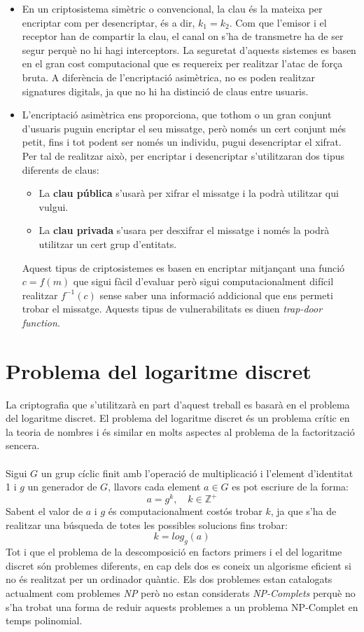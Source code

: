 \documentclass{article}
\begin{document}
\begin{itemize}
	\item En un criptosistema simètric o convencional, la clau és la mateixa per encriptar com per desencriptar, és a dir, $k_1 = k_2$. Com que l'emisor i el receptor han de compartir la clau, el canal on s'ha de transmetre ha de ser segur perquè no hi hagi interceptors. La seguretat d'aquests sistemes es basen en el gran cost computacional que es requereix per realitzar l'atac de força bruta. A diferència de l'encriptació asimètrica, no es poden realitzar signatures digitals, ja que no hi ha distinció de claus entre usuaris.
	\item L'encriptació asimètrica ens proporciona, que tothom o un gran conjunt d'usuaris puguin encriptar el seu missatge, però només un cert conjunt més petit, fins i tot podent ser només un individu, pugui desencriptar el xifrat. Per tal de realitzar això, per encriptar i desencriptar s'utilitzaran dos tipus diferents de claus:
	\begin{itemize}
		\item La \textbf{clau pública} s'usarà per xifrar el missatge i la podrà utilitzar qui vulgui.
		\item La \textbf{clau privada} s'usara per desxifrar el missatge i només la podrà utilitzar un cert grup d'entitats.
	\end{itemize}
	Aquest tipus de criptosistemes es basen en encriptar mitjançant una funció $c = f(m)$ que sigui fàcil d'evaluar però sigui computacionalment difícil realitzar $f^{-1}(c)$ sense saber una informació addicional que ens permeti trobar el missatge. Aquests tipus de vulnerabilitats es diuen \textit{trap-door function}.
\end{itemize}

\section{Problema del logaritme discret}
La criptografia que s'utilitzarà en part d'aquest treball es basarà en el problema del logaritme discret.
El problema del logaritme discret és un problema crític en la teoria de nombres i és similar en molts aspectes al problema de la factorització sencera.
\\
\\
Sigui $G$ un grup cíclic finit amb l'operació de multiplicació i l'element d'identitat 1 i $g$ un generador de $G$, llavors cada element $a \in G$ es pot escriure de la forma:
\[a = g^k, \quad k \in \mathbb{Z^+} \] 
Sabent el valor de $a$ i $g$ és computacionalment costós trobar $k$, ja que s'ha de realitzar una búsqueda de totes les possibles solucions fins trobar:
\[k = log_g(a)\]
Tot i que el problema de la descomposició en factors primers i el del logaritme discret són problemes diferents, en cap dels dos es coneix un algorisme eficient si no és realitzat per un ordinador quàntic. Els dos problemes estan catalogats actualment com problemes \textit{NP}  però no estan considerats \textit{NP-Complets} perquè no s'ha trobat una forma de reduir aquests problemes a un problema NP-Complet en temps polinomial.
\end{document}
